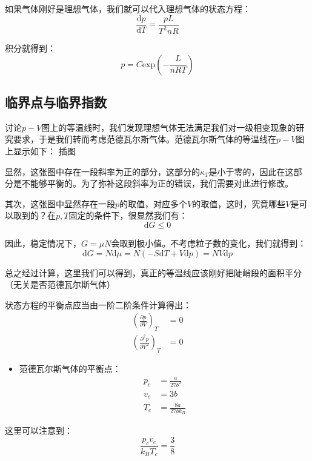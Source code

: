 \documentclass[a4paper, 10pt, openany]{book}%
\begin{document}
如果气体刚好是理想气体，我们就可以代入理想气体的状态方程：
\begin{equation}
  \frac{\mathrm{d}p}{\mathrm{d}T}=\frac{pL}{T^2 nR}
\end{equation}

积分就得到：
\begin{equation}
p=C\mathrm{exp}({-\frac{L}{nRT}})
\end{equation}
\subsection{临界点与临界指数}

讨论$p-V$图上的等温线时，我们发现理想气体无法满足我们对一级相变现象的研究要求，于是我们转而考虑范德瓦尔斯气体。范德瓦尔斯气体的等温线在$p-V$图上显示如下：
插图

显然，这张图中存在一段斜率为正的部分，这部分的$\kappa_T$是小于零的，因此在这部分是不能够平衡的。为了弥补这段斜率为正的错误，我们需要对此进行修改。

其次，这张图中显然存在一段$p$的取值，对应多个$V$的取值，这时，究竟哪些$V$是可以取到的？在$p,T$固定的条件下，很显然我们有：
\begin{equation}
\mathrm{d}G\leq0
\end{equation}

因此，稳定情况下，$G=\mu N$会取到极小值。不考虑粒子数的变化，我们就得到：
\begin{equation}
\mathrm{d}G=N\mathrm{d}\mu=N(-S\mathrm{d}T+V\mathrm{d}p)=NV\mathrm{d}p
\end{equation}

总之经过计算，这里我们可以得到，真正的等温线应该刚好把陡峭段的面积平分（无关是否范德瓦尔斯气体）

状态方程的平衡点应当由一阶二阶条件计算得出：
\begin{align}
\left(\frac{\partial p}{\partial V}\right)_T&=0\\
\left(\frac{\partial^2 p}{\partial V^2}\right)_T&=0
\end{align}
\begin{itemize}
\item 范德瓦尔斯气体的平衡点：
\begin{align}
p_c&=\frac{a}{27b^2}\\
v_c&=3b\\
T_c&=\frac{8a}{27bk_B}
\end{align}
\end{itemize}

这里可以注意到：
\begin{equation}
\frac{p_cv_c}{k_BT_c}=\frac{3}{8}
\end{equation}
\end{document}
